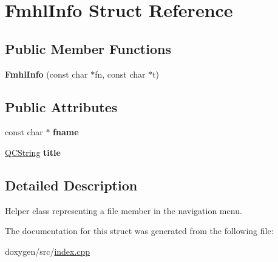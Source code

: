 \hypertarget{struct_fmhl_info}{}\section{Fmhl\+Info Struct Reference}
\label{struct_fmhl_info}
\subsection*{Public Member Functions}
\begin{DoxyCompactItemize}
\item 
\mbox{\label{struct_fmhl_info_ad6bf9ffe4e94be39ab23943d4dbf3826}} 
{\bfseries Fmhl\+Info} (const char $\ast$fn, const char $\ast$t)
\end{DoxyCompactItemize}
\subsection*{Public Attributes}
\begin{DoxyCompactItemize}
\item 
\mbox{\label{struct_fmhl_info_af139ff6dcd5a3078dd119860da575ef5}} 
const char $\ast$ {\bfseries fname}
\item 
\mbox{\label{struct_fmhl_info_afd88c71ff2562f6d67b07845e300f224}} 
\mbox{\hyperlink{class_q_c_string}{Q\+C\+String}} {\bfseries title}
\end{DoxyCompactItemize}


\subsection{Detailed Description}
Helper class representing a file member in the navigation menu. 

The documentation for this struct was generated from the following file\+:\begin{DoxyCompactItemize}
\item 
doxygen/src/\mbox{\hyperlink{index_8cpp}{index.\+cpp}}\end{DoxyCompactItemize}
